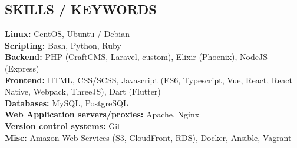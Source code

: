 \documentclass[margin,line]{resume}
\begin{document}
\begin{resume}
    \vspace{-1mm}

\sectionline

    \section{\mysidestyle \textbf{\large{S}\small{KILLS} / \large{K}\small{EYWORDS}}}

    \textbf{Linux:} CentOS, Ubuntu / Debian\\
    \textbf{Scripting:} Bash, Python, Ruby\\
    \textbf{Backend:} PHP (CraftCMS, Laravel, custom), Elixir (Phoenix), NodeJS (Express)\\
    \textbf{Frontend:} HTML, CSS/SCSS, Javascript (ES6, Typescript, Vue, React, React Native, Webpack, ThreeJS), Dart (Flutter)\\
    \textbf{Databases:} MySQL, PostgreSQL\\
    \textbf{Web Application servers/proxies:} Apache, Nginx\\
    \textbf{Version control systems:} Git\\
    \textbf{Misc:} Amazon Web Services (S3, CloudFront, RDS), Docker, Ansible, Vagrant



\end{resume}
\end{document}

